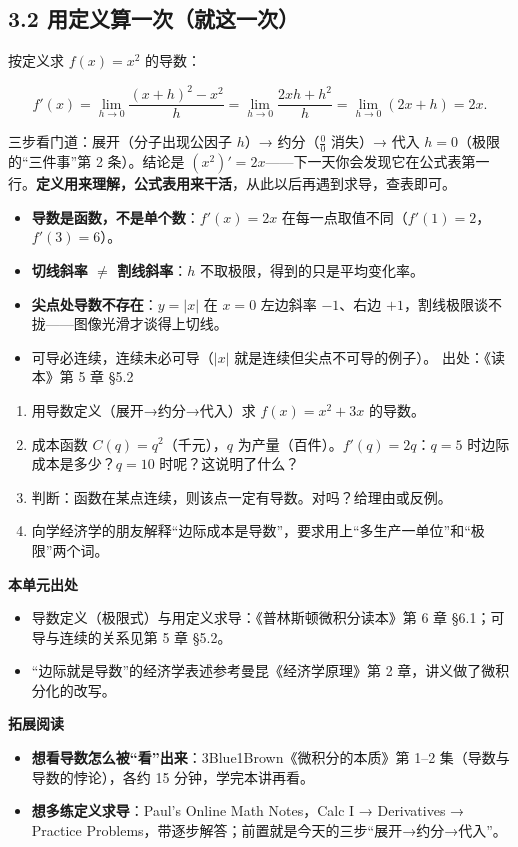 \documentclass[UTF8,a4paper,11pt]{ctexart}
\newcommand{\src}[1]{%
  {\small\colorbox{refbg}{\color{refaccent}出处：#1}}}
\begin{document}
\subsection*{3.2 用定义算一次（就这一次）}

按定义求 $f(x)=x^2$ 的导数：

\[
  f'(x)=\lim_{h\to0}\frac{(x+h)^2-x^2}{h}
       =\lim_{h\to0}\frac{2xh+h^2}{h}
       =\lim_{h\to0}(2x+h)=2x .
\]

三步看门道：展开（分子出现公因子 $h$）→ 约分（$\tfrac{0}{0}$ 消失）→ 代入 $h=0$（极限的“三件事”第 2 条）。结论是 $(x^2)'=2x$——下一天你会发现它在公式表第一行。\textbf{定义用来理解，公式表用来干活}，从此以后再遇到求导，查表即可。

\begin{calcbox}[易错点与失效边界]
\begin{itemize}
  \item \textbf{导数是函数，不是单个数}：$f'(x)=2x$ 在每一点取值不同（$f'(1)=2$，$f'(3)=6$）。
  \item \textbf{切线斜率 $\neq$ 割线斜率}：$h$ 不取极限，得到的只是平均变化率。
  \item \textbf{尖点处导数不存在}：$y=|x|$ 在 $x=0$ 左边斜率 $-1$、右边 $+1$，割线极限谈不拢——图像光滑才谈得上切线。
  \item 可导必连续，连续未必可导（$|x|$ 就是连续但尖点不可导的例子）。\src{《读本》第 5 章 §5.2}
\end{itemize}
\end{calcbox}

\begin{exercise}[今日自测]
\begin{enumerate}
  \item 用导数定义（展开→约分→代入）求 $f(x)=x^2+3x$ 的导数。
  \item 成本函数 $C(q)=q^2$（千元），$q$ 为产量（百件）。$f'(q)=2q$：$q=5$ 时边际成本是多少？$q=10$ 时呢？这说明了什么？
  \item 判断：函数在某点连续，则该点一定有导数。对吗？给理由或反例。
  \item 向学经济学的朋友解释“边际成本是导数”，要求用上“多生产一单位”和“极限”两个词。
\end{enumerate}
\end{exercise}

\begin{reading}
\textbf{本单元出处}
\begin{itemize}
  \item 导数定义（极限式）与用定义求导：《普林斯顿微积分读本》第 6 章 §6.1；可导与连续的关系见第 5 章 §5.2。
  \item “边际就是导数”的经济学表述参考曼昆《经济学原理》第 2 章，讲义做了微积分化的改写。
\end{itemize}
\textbf{拓展阅读}
\begin{itemize}
  \item \textbf{想看导数怎么被“看”出来}：3Blue1Brown《微积分的本质》第 1–2 集（导数与导数的悖论），各约 15 分钟，学完本讲再看。
  \item \textbf{想多练定义求导}：Paul's Online Math Notes，Calc I → Derivatives → Practice Problems，带逐步解答；前置就是今天的三步“展开→约分→代入”。
\end{itemize}
\end{reading}
\end{document}
